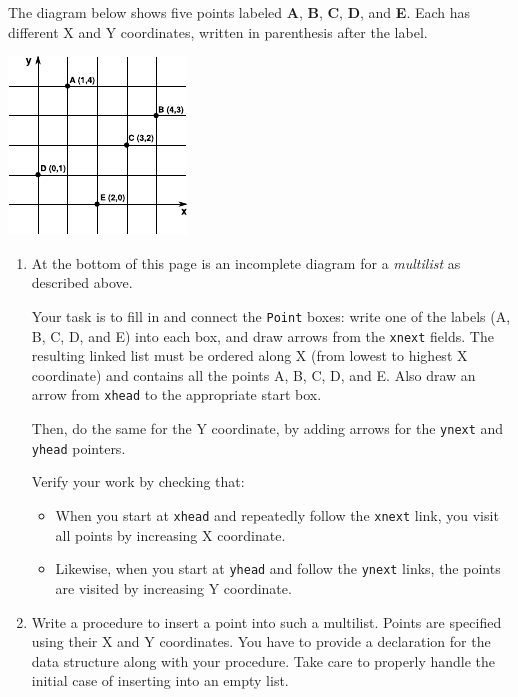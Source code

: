 \documentclass[a4paper]{article}
\begin{document}
The diagram below shows five points labeled \textbf{A}, \textbf{B}, \textbf{C}, \textbf{D}, and \textbf{E}.
Each has different X and Y coordinates, written in parenthesis after the label.

\vfill

\noindent
\begin{center}
  \includegraphics[width=0.4\columnwidth]{q2a.pdf}
\end{center}

\vfill

\begin{enumerate}
\item
  At the bottom of this page is an incomplete diagram for a \emph{multilist} as described above.
  
  Your task is to fill in and connect the \texttt{Point} boxes:
  write one of the labels (A, B, C, D, and E) into each box, and draw arrows from the \texttt{xnext} fields.
  The resulting linked list must be ordered along X (from lowest to highest X coordinate) and contains all the points A, B, C, D, and E.
  Also draw an arrow from \texttt{xhead} to the appropriate start box.
  
  Then, do the same for the Y coordinate, by adding arrows for the \texttt{ynext} and \texttt{yhead} pointers.
  
  Verify your work by checking that:
  \begin{itemize}
  \item
    When you start at \texttt{xhead} and repeatedly follow the \texttt{xnext} link, you visit all points by increasing X coordinate.
  \item
    Likewise, when you start at \texttt{yhead} and follow the \texttt{ynext} links, the points are visited by increasing Y coordinate.
  \end{itemize}
  
\item
  Write a procedure to insert a point into such a multilist.
  Points are specified using their X and Y coordinates.
  You have to provide a declaration for the data structure along with your procedure.
  Take care to properly handle the initial case of inserting into an empty list.
\end{enumerate}
\end{document}

